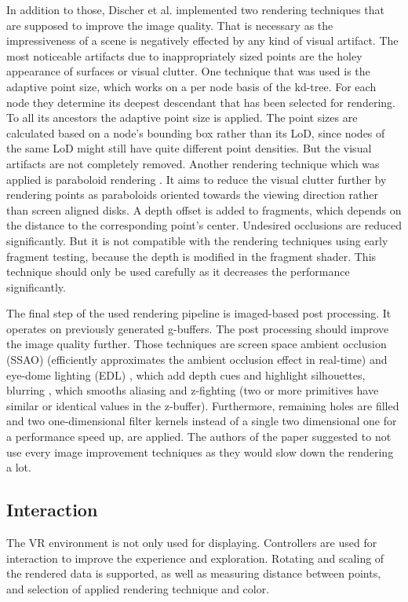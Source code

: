 \documentclass[10pt,twocolumn,letterpaper]{article}
\begin{document}
\setlength{\parindent}{1pc}In addition to those, Discher et al. \cite{discher_point-based_2018} implemented two rendering techniques that are supposed to improve the image quality. That is necessary as the impressiveness of a scene is negatively effected by any kind of visual artifact. The most noticeable artifacts due to inappropriately sized points are the holey appearance of surfaces or visual clutter. One technique that was used is the adaptive point size, which works on a per node basis of the kd-tree. For each node they determine its deepest descendant that has been selected for rendering. To all its ancestors the adaptive point size is applied. The point sizes are calculated based on a node’s bounding box rather than its LoD, since nodes of the same LoD might still have quite different point densities. But the visual artifacts are not completely removed. Another rendering technique which was applied is paraboloid rendering \cite{schutz2016potree}. It aims to reduce the visual clutter further by rendering points as paraboloids oriented towards the viewing direction rather than screen aligned disks. A depth offset is added to fragments, which depends on the distance to the corresponding point's center. Undesired occlusions are reduced significantly. But it is not compatible with the rendering techniques using early fragment testing, because the depth is modified in the fragment shader. This technique should only be used carefully as it decreases the performance significantly.

\setlength{\parindent}{1pc}The final step of the used rendering pipeline is imaged-based post processing. It operates on previously generated g-buffers. The post processing should improve the image quality further. Those techniques are screen space ambient occlusion (SSAO) (efficiently approximates the ambient occlusion effect in real-time) \cite{mittring2007finding} and eye-dome lighting (EDL) \cite{boucheny2009interactive}, which add depth cues and highlight silhouettes, blurring \cite{lukin2016tips}, which smooths aliasing and z-fighting (two or more primitives have similar or identical values in the z-buffer). Furthermore, remaining holes are filled and two one-dimensional filter kernels \cite{dobrev2010image} instead of a single two dimensional one for a performance speed up, are applied. The authors of the paper suggested to not use every image improvement techniques as they would slow down the rendering a lot.

\subsection{Interaction}
The VR environment is not only used for displaying. Controllers are used for interaction to improve the experience and exploration. Rotating and scaling of the rendered data is supported, as well as measuring distance between points, and selection of applied rendering technique and color.
\end{document}
